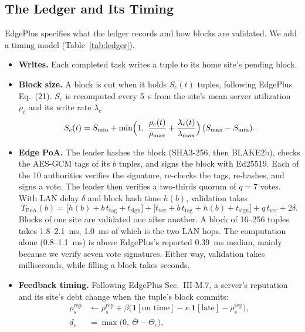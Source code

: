 \documentclass[11pt,journal,onecolumn]{IEEEtran}
\begin{document}
\subsection{The Ledger and Its Timing}
\label{sec:ledger}
EdgePlus specifies what the ledger records and how blocks are validated. We add a timing model (Table~\ref{tab:ledger}).
\begin{itemize}
\item \textbf{Writes.} Each completed task writes a tuple to its home site's pending block.
\item \textbf{Block size.} A block is cut when it holds $S_c(t)$ tuples, following EdgePlus Eq.~(21). $S_c$ is recomputed every 5~s from the site's mean server utilization $\rho_c$ and its write rate $\lambda_c$:
\begin{equation}
S_c(t) = S_{\min} + \min\Bigl(1,\ \frac{\rho_c(t)}{\rho_{\max}} + \frac{\lambda_c(t)}{\lambda_{\max}}\Bigr)\,(S_{\max} - S_{\min}) .
\label{eq:blocksize}
\end{equation}
\item \textbf{Edge PoA.} The leader hashes the block (SHA3-256, then BLAKE2b), checks the AES-GCM tags of its $b$ tuples, and signs the block with Ed25519. Each of the 10 authorities verifies the signature, re-checks the tags, re-hashes, and signs a vote. The leader then verifies a two-thirds quorum of $q=7$ votes. With LAN delay $\delta$ and block hash time $h(b)$, validation takes
\begin{equation}
T_{\mathrm{PoA}}(b) = \bigl[h(b) + b\,t_{\mathrm{tag}} + t_{\mathrm{sign}}\bigr] + \bigl[t_{\mathrm{ver}} + b\,t_{\mathrm{tag}} + h(b) + t_{\mathrm{sign}}\bigr] + q\,t_{\mathrm{ver}} + 2\delta .
\label{eq:poa}
\end{equation}
Blocks of one site are validated one after another. A block of 16--256 tuples takes 1.8--2.1~ms, 1.0~ms of which is the two LAN hops. The computation alone (0.8--1.1~ms) is above EdgePlus's reported 0.39~ms median, mainly because we verify seven vote signatures. Either way, validation takes milliseconds, while filling a block takes seconds.
\item \textbf{Feedback timing.} Following EdgePlus Sec.~III-M.7, a server's reputation and its site's debt change when the tuple's block commits:
\begin{align}
\rho^{\mathrm{rep}}_s &\leftarrow \rho^{\mathrm{rep}}_s + \beta\bigl(\mathbf{1}[\text{on time}] - \kappa\,\mathbf{1}[\text{late}] - \rho^{\mathrm{rep}}_s\bigr), \label{eq:rep}\\
d_c &= \max\bigl(0,\ \bar{\Theta} - \Theta_c\bigr), \label{eq:debt}

\end{align}
\end{itemize}
\end{document}
